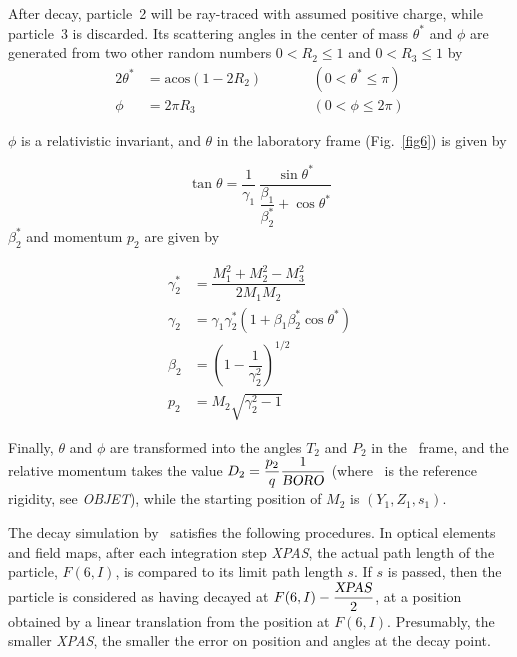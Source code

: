 \noindent After decay, particle~2  will  be ray-traced with assumed positive
charge, while particle~3 is discarded.  Its scattering angles in the center of mass 
$ \theta^\ast $ and $\phi$ are generated from two other random numbers 
$0<R_2\leq 1 $ and $ 0<R_3\leq 1 $ by
%
 \begin{alignat*}{2}
	 \theta^ \ast 
	       & =   \textrm{acos} (1 - 2R_2) & \qquad & (0   <\theta^\ast \leq \pi ) \\
	\phi 
	       & =   2\pi R_3         & \qquad &  (0<\phi \leq 2\pi ) 
 \end{alignat*}
%

\smallskip


\noindent $\phi$ is a relativistic invariant, and $\theta$ in the laboratory
frame (Fig.~\ref{fig6}) is given by    

$$ \tan \theta = \dfrac{1 }{ \gamma_1}\, 
    \dfrac{ \sin \theta^ \ast }{\dfrac{\beta_1 }{ \beta^ \ast_ 2}+ \cos \theta^\ast} 
    $$
%
  $ \beta^ \ast_ 2 $ and momentum $ p_2 $ are given by 

 \begin{align*}
	 \gamma^\ast_ 2 
	         & = \dfrac{M^2_1 + M^2_2 - M^2_3 }{ 2M_1M_2} \\
	\gamma_2
	         & =   \gamma_1\gamma^ \ast_ 2 
	         	\left(1+\beta_1 \beta^\ast_ 2 \cos \theta^ \ast \right) \\
	\beta_ 2 
	         & =  \left( 1- \dfrac{1 }{ \gamma^2_2} \right)^{1/2} \\
	p_2 
	         & = M_2 \sqrt{ \gamma^2_2 -1} 
 \end{align*}
 
\noindent Finally, $\theta$ and $\phi$ are transformed into the angles $ T_2 $
and $ P_2 $ in the \zgou\ frame, and the relative momentum takes the value 
$ D_2= \dfrac{p_2 }{ q} \dfrac{1}{\textsl{BORO}} $ (where \BORO\   
is the reference rigidity, see \textsl{OBJET}), while the starting position of 
$M_2 $ is $ (Y_1 , Z_1, s_1) $.   

\bigskip

\noindent The decay simulation by \zgou\  satisfies  the following procedures.
In optical elements and field maps, after each integration step \textsl{XPAS}, the actual 
path length of the particle, $ F(6,I) $, is compared to its limit path length $ s$. 
 If $s $ is passed, then the particle is considered as having decayed at 
 $ F(6,I) - \dfrac{\text{\textsl{XPAS}} }{ 2} $, 
at a position obtained by a linear translation from the position at $ F(6,I)$.
Presumably, the smaller \textsl{XPAS},  the smaller the error on position
and angles at the decay point.  

